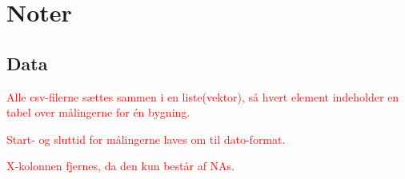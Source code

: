 \chapter{Noter}

\section{Data}
\textcolor{red}{Alle csv-filerne sættes sammen i en liste(vektor), så hvert element indeholder en tabel over målingerne for én bygning.}

\textcolor{red}{Start- og sluttid for målingerne laves om til dato-format.}

\textcolor{red}{X-kolonnen fjernes, da den kun består af NAs.}